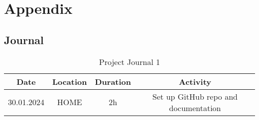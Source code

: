 \chapter{Appendix}
\label{cha:Appendix}

\section{Journal}
\label{sec:Journal}

\begin{table}[H]
    \centering
    
\begin{tabular}{||c | c | c || c||} 
 \hline
 Date &  Location & Duration & Activity \\ [0.5ex] 
 \hline\hline
  30.01.2024 & HOME & 2h & Set up GitHub repo and documentation \\ 
 \hline

\end{tabular}
    \caption{Project Journal 1}
    \label{tab:Project Journal 1}
\end{table}

\newpage